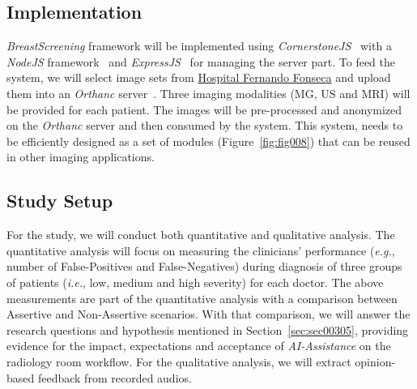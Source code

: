 \subsection{Implementation}
\label{sec:sec00402}

{\it BreastScreening} framework will be implemented using {\it CornerstoneJS}\footnotemark[2]~\cite{urban2017lesiontracker} with a {\it NodeJS} framework\footnotemark[3]~\cite{10.5555/3002437, drnasin2017javascript} and {\it ExpressJS}\footnotemark[4]~\cite{10.1117/12.2285952} for managing the server part.
To feed the system, we will select image sets from \hyperlink{https://hff.min-saude.pt/}{Hospital Fernando Fonseca} and upload them into an {\it Orthanc} server~\cite{Jodogne2018}.
Three imaging modalities (MG, US and MRI) will be provided for each patient.
The images will be pre-processed and anonymized on the {\it Orthanc} server and then consumed by the system.
This system, needs to be efficiently designed as a set of modules (Figure~\ref{fig:fig008}) that can be reused in other imaging applications.



\subsection{Study Setup}
\label{sec:sec00403}

For the study, we will conduct both quantitative and qualitative analysis.
The quantitative analysis will focus on measuring the clinicians' performance ({\it e.g.}, number of False-Positives and False-Negatives) during diagnosis of three groups of patients ({\it i.e.}, low, medium and high severity) for each doctor.
The above measurements are part of the quantitative analysis with a comparison between Assertive and Non-Assertive scenarios.
With that comparison, we will answer the  research questions and hypothesis mentioned in Section~\ref{sec:sec00305}, providing evidence for the impact, expectations and acceptance of {\it AI-Assistance} on the radiology room workflow.
For the qualitative analysis, we will extract opinion-based feedback from recorded audios.

